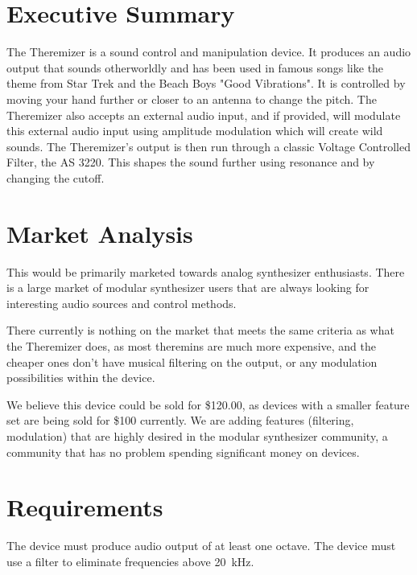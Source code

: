 \documentclass[11pt]{report}
\begin{document}
	\section{Executive Summary}
	The Theremizer is a sound control and manipulation device. It produces an audio output that sounds otherworldly and has been used in famous songs like the theme from Star Trek and the Beach Boys "Good Vibrations". It is controlled by moving your hand further or closer to an antenna to change the pitch. The Theremizer also accepts an external audio input, and if provided, will modulate this external audio input using amplitude modulation which will create wild sounds. The Theremizer's output is then run through a classic Voltage Controlled Filter, the AS 3220. This shapes the sound further using resonance and by changing the cutoff.
	\section{Market Analysis}
	This would be primarily marketed towards analog synthesizer enthusiasts. There is a large market of modular synthesizer users that are always looking for interesting audio sources and control methods. \par There currently is nothing on the market that meets the same criteria as what the Theremizer does, as most theremins are much more expensive, and the cheaper ones don't have musical filtering on the output, or any modulation possibilities within the device.
	\par We believe this device could be sold for \$120.00, as devices with a smaller feature set are being sold for \$100 currently. We are adding features (filtering, modulation) that are highly desired in the modular synthesizer community, a community that has no problem spending significant money on devices.
	\section{Requirements}
		The device must produce audio output of at least one octave. The device must use a filter to eliminate frequencies above \SI{20}{\kilo\hertz}. 
\end{document}
